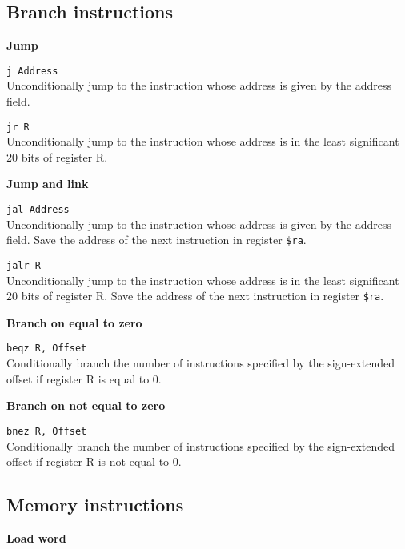 \documentclass[12pt]{report}
\newcommand\subscr[1]{\raisebox{-0.5ex}{\small #1}}
\newcommand\regs{R\subscr{s}}
\begin{document}
\subsection{Branch instructions}

\noindent
{\bf Jump}

\texttt{j Address}\\
Unconditionally jump to the instruction whose address is given by the address field.
\vspace{1ex}

\texttt{jr \regs}\\
Unconditionally jump to the instruction whose
address is in the least significant 20 bits of register \regs{}.
\vspace{1ex}

\noindent
{\bf Jump and link}

\texttt{jal Address}\\
Unconditionally jump to the instruction whose address is given by the address field.
Save the address of the next instruction in register \texttt{\$ra}.
\vspace{1ex}

\texttt{jalr \regs}\\
Unconditionally jump to the instruction whose
address is in the least significant 20 bits of register \regs{}.
Save the address of the next instruction in register \texttt{\$ra}.
\vspace{1ex}

\newpage
\noindent
{\bf Branch on equal to zero}

\texttt{beqz \regs, Offset}\\
Conditionally branch the number of instructions specified by the
sign-extended offset if register \regs{} is equal to 0.
\vspace{1ex}

\noindent
{\bf Branch on not equal to zero}

\texttt{bnez \regs, Offset}\\
Conditionally branch the number of instructions specified by the
sign-extended offset if register \regs{} is not equal to 0.
\vspace{1ex}

\subsection{Memory instructions}

\noindent
{\bf Load word}
\end{document}

